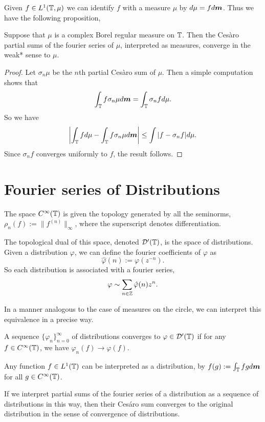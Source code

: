 \documentclass{owmaths}
\begin{document}
Given $f \in L^1(\mathbb{T},\mu)$ we can identify $f$
with a measure $\mu$ by $d\mu = fd\boldsymbol{m}$. Thus we have the following proposition,
\begin{proposition}
    Suppose that $\mu$ is a complex Borel regular measure on $\mathbb{T}$. Then 
    the Ces\`aro partial sums of the fourier series of $\mu$, interpreted
    as measures, converge in the weak* sense to $\mu$. 
\end{proposition}
\begin{proof}
    Let $\sigma_n \mu$ be the $n$th partial Ces\`aro sum of $\mu$. Then a simple
    computation shows that
    \begin{equation*}
        \int_{\mathbb{T}} f \sigma_n \mu d\boldsymbol{m} = \int_{\mathbb{T}} \sigma_n f d\mu.
    \end{equation*}
    So we have 
    \begin{equation*}
        \left|\int_{\mathbb{T}} f d\mu - \int_{\mathbb{T}} f \sigma_n \mu d\boldsymbol{m}\right| \leq \int |f-\sigma_n f|d\mu.
    \end{equation*}
    Since $\sigma_n f$ converges uniformly to $f$, the result follows. 
\end{proof}

\section{Fourier series of Distributions}
The space $C^\infty(\mathbb{T})$ is given the topology generated by all
the seminorms, $\rho_n(f) := \|f^{(n)}\|_\infty$, where the superscript
denotes differentiation. 

The topological dual of this space, denoted $\mathcal{D}'(\mathbb{T})$,
is the space of distributions. Given a distribution $\varphi$, we
can define the fourier coefficients of $\varphi$ as
\begin{equation*}
    \hat{\varphi}(n) := \varphi(z^{-n}).
\end{equation*}
So each distribution is associated with a fourier series,
\begin{equation*}
    \varphi \sim \sum_{n \in \mathbb{Z}} \hat{\varphi}(n)z^n.
\end{equation*}

In a manner analogous to the case of measures on the circle, we can interpret
this equivalence in a precise way. 

A sequence $\{\varphi_n\}_{n=0}^\infty$ of distributions converges to $\varphi \in \mathcal{D}'(\mathbb{T})$ if 
for any $f \in C^\infty(\mathbb{T})$, we have $\varphi_n(f)\rightarrow \varphi(f)$. 

Any function $f \in L^1(\mathbb{T})$ can be interpreted as a distribution,
by $f(g) := \int_{\mathbb{T}} fg d\boldsymbol{m}$ for all $g \in C^\infty(\mathbb{T})$. 

If we interpret partial sums of the fourier series of a distribution as a sequence
of distributions in this way, then their Ces\'aro sum converges to the original
distribution in the sense of convergence of distributions. 
\end{document}
